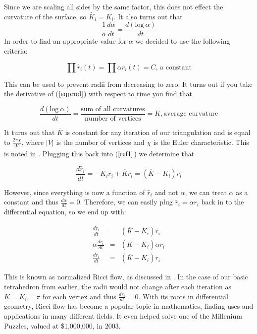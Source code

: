 \documentclass[12pt]{article}
\begin{document}
\noindent Since we are scaling all sides by the same factor, this does not effect the curvature of the surface, so $\tilde{K_i} = K_i$. It also turns out that $$\displaystyle \frac{1}{\alpha} \frac{d\alpha}{dt} = \frac{d(\mbox{log}~\alpha)}{dt}$$ 
 In order to find an appropriate value for $\alpha$ we decided to use the following criteria:
 
\begin{equation}
\label{eqprod}
\prod{\tilde{r_i}(t)} = \prod{\alpha r_i(t)} = C\mbox{, a constant}
\end{equation}

\noindent This can be used to prevent radii from decreasing to zero. It turns out if you take the derivative of ($\ref{eqprod}$) with respect to time you find that 
 
\begin{equation}
\label{proof1}
\frac{d(\mbox{log}~\alpha)}{dt} = \frac{\mbox{sum of all curvatures}}{\mbox{number of vertices}} = \overline{K}, \mbox{average curvature}
\end{equation}
 
\noindent It turns out that $\overline{K}$ is constant for any iteration of our triangulation and is equal to $\displaystyle\frac{2\pi\chi}{|V|}$, where $|V|$ is the number of vertices and $\chi$ is the Euler characteristic. This is noted in \cite{chowluo}. Plugging this back into ($\ref{ref1}$) we determine that

\begin{equation}
\frac{d\tilde{r_i}}{dt} = -\tilde{K_i}\tilde{r_i} + \overline{K}\tilde{r_i} = (\overline{K} - K_i)\tilde{r_i}
\end{equation}

\noindent However, since everything is now a function of $\tilde{r_i}$ and not $\alpha$, we can treat $\alpha$ as a constant and thus $\displaystyle\frac{d\alpha}{dt} = 0$. Therefore, we can easily plug $\tilde{r_i} = \alpha r_i$ back in to the differential equation, so we end up with:

\begin{eqnarray}
\label{Riccin}
\frac{d\tilde{r_i}}{dt} &=& (\overline{K} - K_i)\tilde{r_i} \nonumber \\
\alpha\frac{dr_i}{dt} &=& (\overline{K} - K_i)\alpha r_i \nonumber \\
\frac{dr_i}{dt} &=& (\overline{K} - K_i)r_i
\end{eqnarray}

\noindent This is known as normalized Ricci flow, as discussed in \cite{chowluo}. In the case of our basic tetrahedron from earlier, the radii would not change after each iteration as $\overline{K} = K_i = \pi$ for each vertex and thus $\displaystyle\frac{dr_i}{dt} = 0$. With its roots in differential geometry, Ricci flow has become a popular topic in mathematics, finding uses and applications in many different fields. It even helped solve one of the Millenium Puzzles, valued at \$1,000,000, in 2003. \cite{wikipoin}  
\end{document}
